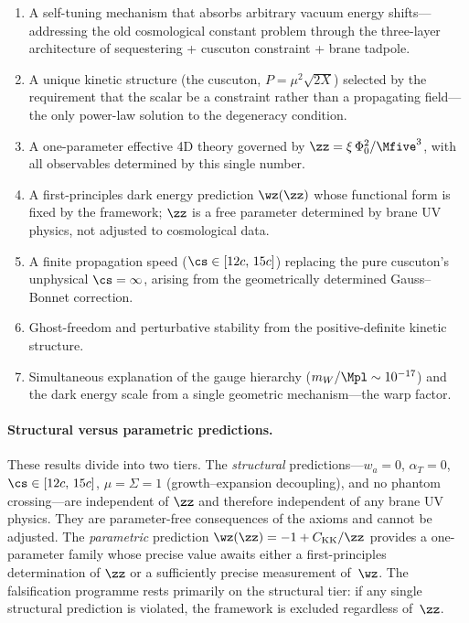 \begin{enumerate}
\item A self-tuning mechanism that absorbs arbitrary vacuum energy shifts---addressing the old cosmological constant problem through the three-layer architecture of sequestering + cuscuton constraint + brane tadpole.

\item A unique kinetic structure (the cuscuton, $P = \mu^2\sqrt{2X}$) selected by the requirement that the scalar be a constraint rather than a propagating field---the only power-law solution to the degeneracy condition.

\item A one-parameter effective 4D theory governed by $\zz = \xi\,\Phi_0^2/\Mfive^3$, with all observables determined by this single number.

\item A first-principles dark energy prediction $\wz(\zz)$ whose functional form is fixed by the framework; $\zz$ is a free parameter determined by brane UV physics, not adjusted to cosmological data.

\item A finite propagation speed ($\cs \in [12c,\, 15c]$) replacing the pure cuscuton's unphysical $\cs = \infty$, arising from the geometrically determined Gauss--Bonnet correction.

\item Ghost-freedom and perturbative stability from the positive-definite kinetic structure.

\item Simultaneous explanation of the gauge hierarchy ($m_W/\Mpl \sim 10^{-17}$) and the dark energy scale from a single geometric mechanism---the warp factor.
\end{enumerate}

\paragraph{Structural versus parametric predictions.}
These results divide into two tiers. The \emph{structural} predictions---$w_a = 0$, $\alpha_T = 0$, $\cs \in [12c,\, 15c]$, $\mu = \Sigma = 1$ (growth--expansion decoupling), and no phantom crossing---are independent of $\zz$ and therefore independent of any brane UV physics. They are parameter-free consequences of the axioms and cannot be adjusted. The \emph{parametric} prediction $\wz(\zz) = -1 + C_{\mathrm{KK}}/\zz$ provides a one-parameter family whose precise value awaits either a first-principles determination of $\zz$ or a sufficiently precise measurement of~$\wz$. The falsification programme rests primarily on the structural tier: if any single structural prediction is violated, the framework is excluded regardless of~$\zz$.

